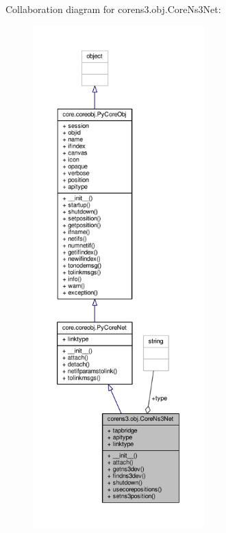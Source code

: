 Collaboration diagram for corens3.\+obj.\+Core\+Ns3\+Net\+:
\nopagebreak
\begin{figure}[H]
\begin{center}
\leavevmode
\includegraphics[height=550pt]{classcorens3_1_1obj_1_1_core_ns3_net__coll__graph}
\end{center}
\end{figure}
